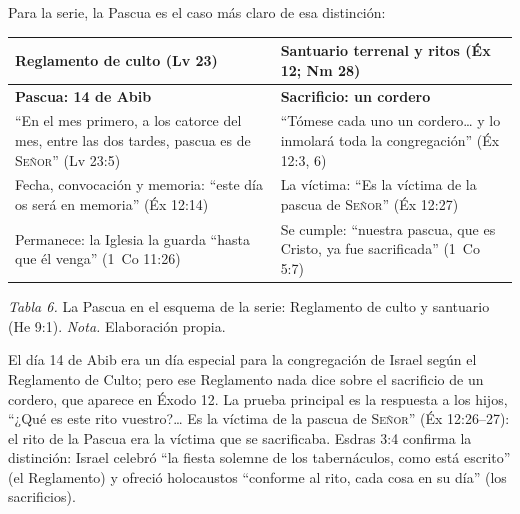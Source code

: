 \documentclass[11pt,letterpaper]{article}
\newcommand{\SENOR}{\textsc{Señor}}
\begin{document}
Para la serie, la Pascua es el caso más claro de esa distinción:

\begin{table}[!htbp]\centering\small\renewcommand{\arraystretch}{1.25}
\begin{tabular}{@{}L{6.8cm}L{6.8cm}@{}}
\toprule
\textbf{Reglamento de culto} (Lv 23) & \textbf{Santuario terrenal y ritos} (Éx 12; Nm 28) \\ \midrule
\textbf{Pascua: 14 de Abib} & \textbf{Sacrificio: un cordero} \\
``En el mes primero, a los catorce del mes, entre las dos tardes, pascua es de \SENOR'' (Lv 23:5) & ``Tómese cada uno un cordero\ldots{} y lo inmolará toda la congregación'' (Éx 12:3, 6) \\
Fecha, convocación y memoria: ``este día os será en memoria'' (Éx 12:14) & La víctima: ``Es la víctima de la pascua de \SENOR'' (Éx 12:27) \\
Permanece: la Iglesia la guarda ``hasta que él venga'' (1~Co 11:26) & Se cumple: ``nuestra pascua, que es Cristo, ya fue sacrificada'' (1~Co 5:7) \\
\bottomrule
\end{tabular}\par
{\footnotesize\color{sepia}\textit{Tabla 6.} La Pascua en el esquema de la serie: Reglamento de culto y santuario (He 9:1). \textit{Nota.} Elaboración propia.}
\end{table}

El día 14 de Abib era un día especial para la congregación de Israel según el Reglamento de Culto; pero ese Reglamento nada dice sobre el sacrificio de un cordero, que aparece en Éxodo 12. La prueba principal es la respuesta a los hijos, ``¿Qué es este rito vuestro?\ldots{} Es la víctima de la pascua de \SENOR'' (Éx 12:26--27): el rito de la Pascua era la víctima que se sacrificaba. Esdras 3:4 confirma la distinción: Israel celebró ``la fiesta solemne de los tabernáculos, como está escrito'' (el Reglamento) y ofreció holocaustos ``conforme al rito, cada cosa en su día'' (los sacrificios).
\end{document}
